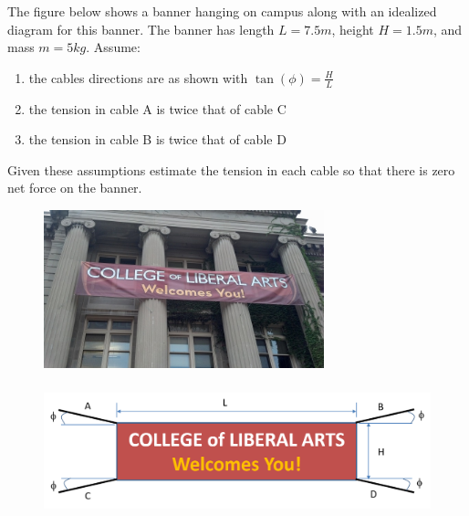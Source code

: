 

The figure below shows a banner hanging on campus along with an idealized diagram for this banner. The banner has length $L = 7.5m$, height $H = 1.5m$, and mass $m = 5kg$. Assume:
\begin{enumerate}
  \item the cables directions are as shown with $\tan(\phi) = \frac{H}{L}$
  \item the tension in cable A is twice that of cable C
  \item the tension in cable B is twice that of cable D
\end{enumerate}
Given these assumptions estimate the tension in each cable so that there is zero net force on the banner.

\begin{figure}[ht!]
  \centering
  \includegraphics[height=1.8in]{figa.png}
  \includegraphics[height=1.8in]{figb.png}
\end{figure}

